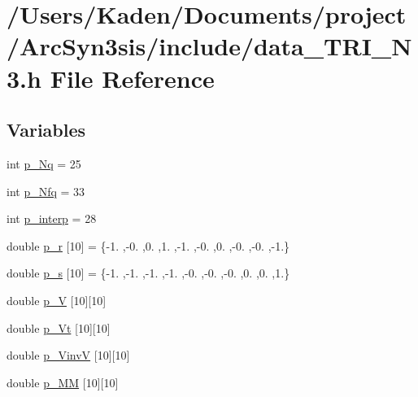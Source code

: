 \hypertarget{a00452}{}\section{/\+Users/\+Kaden/\+Documents/project/\+Arc\+Syn3sis/include/data\+\_\+\+T\+R\+I\+\_\+\+N3.h File Reference}
\label{a00452}
\subsection*{Variables}
\begin{DoxyCompactItemize}
\item 
int \hyperlink{a00452_a207fd9268dfef5bf1505928a4f4c774a}{p\+\_\+\+Nq} = 25
\item 
int \hyperlink{a00452_aa030b0a9fe619a48647119bacea600e0}{p\+\_\+\+Nfq} = 33
\item 
int \hyperlink{a00452_a240743866e0fdfc2ade414eedd98fde2}{p\+\_\+interp} = 28
\item 
double \hyperlink{a00452_ad0e413c816dfa121d92ed67c43d35071}{p\+\_\+r} \mbox{[}10\mbox{]} = \{-\/1. ,-\/0. ,0. ,1. ,-\/1. ,-\/0. ,0. ,-\/0. ,-\/0. ,-\/1.\}
\item 
double \hyperlink{a00452_ab412f40aac46b2e78aceb916a6f1b16f}{p\+\_\+s} \mbox{[}10\mbox{]} = \{-\/1. ,-\/1. ,-\/1. ,-\/1. ,-\/0. ,-\/0. ,-\/0. ,0. ,0. ,1.\}
\item 
double \hyperlink{a00452_a3ce0aff596e0e04ac86e2418524f4eeb}{p\+\_\+V} \mbox{[}10\mbox{]}\mbox{[}10\mbox{]}
\item 
double \hyperlink{a00452_a3c1835d0405d5df5620a8e30be6fef99}{p\+\_\+\+Vt} \mbox{[}10\mbox{]}\mbox{[}10\mbox{]}
\item 
double \hyperlink{a00452_a38e10d1b336d7d183ca23dd81d6f904b}{p\+\_\+\+VinvV} \mbox{[}10\mbox{]}\mbox{[}10\mbox{]}
\item 
double \hyperlink{a00452_ad71c0df2aec984429caaee5dd3ebfc9b}{p\+\_\+\+MM} \mbox{[}10\mbox{]}\mbox{[}10\mbox{]}

\end{DoxyCompactItemize}

